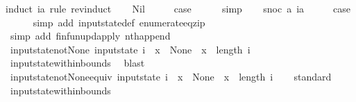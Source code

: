 \begin{isabellebody}
%
\isadelimproof
%
\endisadelimproof
%
\isatagproof
{}\isamarkupfalse%
{\isacharparenleft}induct\ ia\ rule{\isacharcolon}\ rev{\isacharunderscore}induct{\isacharparenright}\isanewline
\ \ \isamarkupfalse%
\ Nil\isanewline
\ \ \isamarkupfalse%
\ \isamarkupfalse%
\ {\isacharquery}case\isanewline
\ \ \ \ \isamarkupfalse%
\ simp\isanewline
{}\isamarkupfalse%
\isanewline
\ \ \isamarkupfalse%
\ {\isacharparenleft}snoc\ a\ ia{\isacharparenright}\isanewline
\ \ \isamarkupfalse%
\ \isamarkupfalse%
\ {\isacharquery}case\isanewline
\ \ \ \ \isamarkupfalse%
\ {\isacharparenleft}simp\ add{\isacharcolon}\ input{}state{\isacharunderscore}def\ enumerate{\isacharunderscore}eq{\isacharunderscore}zip{\isacharparenright}\isanewline
\ \ \ \ \isamarkupfalse%
\ {\isacharparenleft}simp\ add{\isacharcolon}\ finfun{\isacharunderscore}upd{\isacharunderscore}apply\ nth{\isacharunderscore}append{\isacharparenright}\isanewline
{}\isamarkupfalse%
%
\endisatagproof
{\isafoldproof}%
%
\isadelimproof
\isanewline
%
\endisadelimproof
\isanewline
{}\isamarkupfalse%
\ input{}state{\isacharunderscore}not{\isacharunderscore}None{\isacharcolon}\ {\isachardoublequoteopen}{\isacharparenleft}input{}state\ i\ {\isachardollar}\ x\ {\isasymnoteq}\ None{\isacharparenright}\ {\isasymLongrightarrow}\ {\isacharparenleft}x\ {\isacharless}\ length\ i{\isacharparenright}{\isachardoublequoteclose}\isanewline
%
\isadelimproof
\ \ %
\endisadelimproof
%
\isatagproof
{}\isamarkupfalse%
\ input{}state{\isacharunderscore}within{\isacharunderscore}bounds\ \isamarkupfalse%
\ blast%
\endisatagproof
{\isafoldproof}%
%
\isadelimproof
\isanewline
%
\endisadelimproof
\isanewline
{}\isamarkupfalse%
\ input{}state{\isacharunderscore}not{\isacharunderscore}None{\isacharunderscore}equiv{\isacharcolon}\ {\isachardoublequoteopen}{\isacharparenleft}input{}state\ i\ {\isachardollar}\ x\ {\isasymnoteq}\ None{\isacharparenright}\ {\isacharequal}\ {\isacharparenleft}x\ {\isacharless}\ length\ i{\isacharparenright}{\isachardoublequoteclose}\isanewline
%
\isadelimproof
\ \ %
\endisadelimproof
%
\isatagproof
{}\isamarkupfalse%
\ standard\isanewline
\ \ \isamarkupfalse%
\ input{}state{\isacharunderscore}within{\isacharunderscore}bounds\ \isamarkupfalse%

\end{isabellebody}
